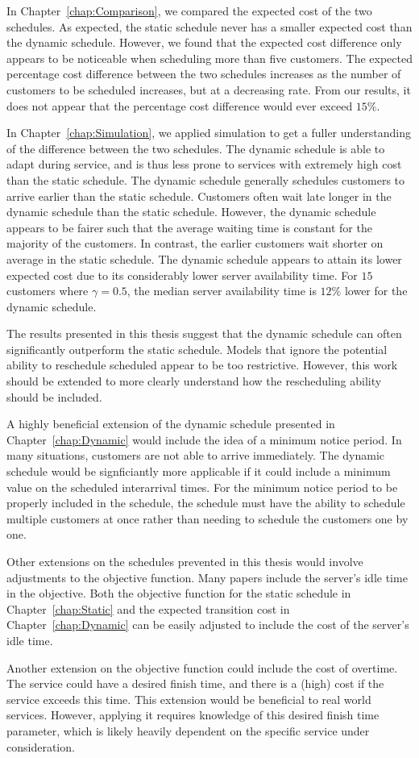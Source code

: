In Chapter~\ref{chap:Comparison}, we compared the expected cost of the two schedules. As expected, the static schedule never has a smaller expected cost than the dynamic schedule. However, we found that the expected cost difference only appears to be noticeable when scheduling more than five customers. The expected percentage cost difference between the two schedules increases as the number of customers to be scheduled increases, but at a decreasing rate. From our results, it does not appear that the percentage cost difference would ever exceed $15 \%$.

In Chapter~\ref{chap:Simulation}, we applied simulation to get a fuller understanding of the difference between the two schedules. The dynamic schedule is able to adapt during service, and is thus less prone to services with extremely high cost than the static schedule. The dynamic schedule generally schedules customers to arrive earlier than the static schedule. Customers often wait late longer in the dynamic schedule than the static schedule. However, the dynamic schedule appears to be fairer such that the average waiting time is constant for the majority of the customers. In contrast, the earlier customers wait shorter on average in the static schedule. The dynamic schedule appears to attain its lower expected cost due to its considerably lower server availability time. For $15$ customers where $\gamma = 0.5$, the median server availability time is $12 \%$ lower for the dynamic schedule.

The results presented in this thesis suggest that the dynamic schedule can often significantly outperform the static schedule. Models that ignore the potential ability to reschedule scheduled appear to be too restrictive. However, this work should be extended to more clearly understand how the rescheduling ability should be included.

A highly beneficial extension of the dynamic schedule presented in Chapter~\ref{chap:Dynamic} would include the idea of a minimum notice period. In many situations, customers are not able to arrive immediately. The dynamic schedule would be signficiantly more applicable if it could include a minimum value on the scheduled interarrival times. For the minimum notice period to be properly included in the schedule, the schedule must have the ability to schedule multiple customers at once rather than needing to schedule the customers one by one.

Other extensions on the schedules prevented in this thesis would involve adjustments to the objective function. Many papers include the server's idle time in the objective. Both the objective function for the static schedule in Chapter~\ref{chap:Static} and the expected transition cost in Chapter~\ref{chap:Dynamic} can be easily adjusted to include the cost of the server's idle time.

Another extension on the objective function could include the cost of overtime. The service could have a desired finish time, and there is a (high) cost if the service exceeds this time. This extension would be beneficial to real world services. However, applying it requires knowledge of this desired finish time parameter, which is likely heavily dependent on the specific service under consideration.